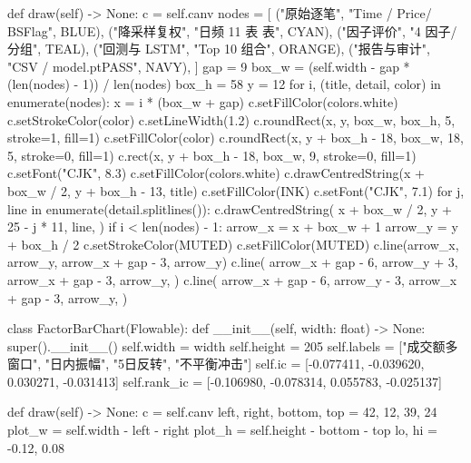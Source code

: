 \documentclass[UTF8,a4paper,fontset=fandol]{ctexart}
\begin{document}
\begin{ProjectCode}
    def draw(self) -> None:
        c = self.canv
        nodes = [
            ("原始逐笔", "Time / Price\nVolume / BSFlag", BLUE),
            ("降采样复权", "日频 11 表 表", CYAN),
            ("因子评价", "4 因子\nIC / 分组", TEAL),
            ("回测与 LSTM", "Top 10 组合", ORANGE),
            ("报告与审计", "CSV / model.pt\nvalidation PASS", NAVY),
        ]
        gap = 9
        box_w = (self.width - gap * (len(nodes) - 1)) / len(nodes)
        box_h = 58
        y = 12
        for i, (title, detail, color) in enumerate(nodes):
            x = i * (box_w + gap)
            c.setFillColor(colors.white)
            c.setStrokeColor(color)
            c.setLineWidth(1.2)
            c.roundRect(x, y, box_w, box_h, 5, stroke=1, fill=1)
            c.setFillColor(color)
            c.roundRect(x, y + box_h - 18, box_w, 18, 5, stroke=0, fill=1)
            c.rect(x, y + box_h - 18, box_w, 9, stroke=0, fill=1)
            c.setFont("CJK", 8.3)
            c.setFillColor(colors.white)
            c.drawCentredString(x + box_w / 2, y + box_h - 13, title)
            c.setFillColor(INK)
            c.setFont("CJK", 7.1)
            for j, line in enumerate(detail.splitlines()):
                c.drawCentredString(
                    x + box_w / 2,
                    y + 25 - j * 11,
                    line,
                )
            if i < len(nodes) - 1:
                arrow_x = x + box_w + 1
                arrow_y = y + box_h / 2
                c.setStrokeColor(MUTED)
                c.setFillColor(MUTED)
                c.line(arrow_x, arrow_y, arrow_x + gap - 3, arrow_y)
                c.line(
                    arrow_x + gap - 6,
                    arrow_y + 3,
                    arrow_x + gap - 3,
                    arrow_y,
                )
                c.line(
                    arrow_x + gap - 6,
                    arrow_y - 3,
                    arrow_x + gap - 3,
                    arrow_y,
                )


class FactorBarChart(Flowable):
    def __init__(self, width: float) -> None:
        super().__init__()
        self.width = width
        self.height = 205
        self.labels = ["成交额多窗口", "日内振幅", "5日反转", "不平衡冲击"]
        self.ic = [-0.077411, -0.039620, 0.030271, -0.031413]
        self.rank_ic = [-0.106980, -0.078314, 0.055783, -0.025137]

    def draw(self) -> None:
        c = self.canv
        left, right, bottom, top = 42, 12, 39, 24
        plot_w = self.width - left - right
        plot_h = self.height - bottom - top
        lo, hi = -0.12, 0.08


\end{ProjectCode}
\end{document}
